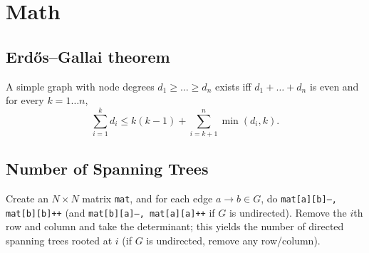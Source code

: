 \section{Math}
	\subsection{Erdős–Gallai theorem}
		A simple graph with node degrees $d_1 \ge \dots \ge d_n$ exists iff $d_1 + \dots + d_n$ is even and for every $k = 1\dots n$,
		$$ \sum _{i=1}^{k}d_{i}\leq k(k-1)+\sum _{i=k+1}^{n}\min(d_{i},k). $$

	\subsection{Number of Spanning Trees}
		Create an $N\times N$ matrix \texttt{mat}, and for each edge $a \rightarrow b \in G$, do
		\texttt{mat[a][b]--, mat[b][b]++} (and \texttt{mat[b][a]--, mat[a][a]++} if $G$ is undirected).
		Remove the $i$th row and column and take the determinant; this yields the number of directed spanning trees rooted at $i$
		(if $G$ is undirected, remove any row/column).\\

	
